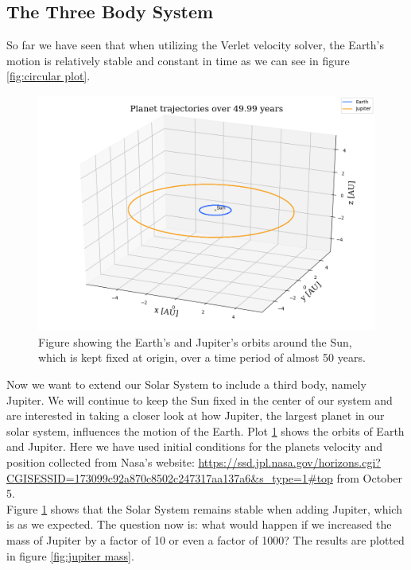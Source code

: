 \documentclass[12pt]{article}
\numberwithin{figure}{section}
\numberwithin{table}{section}
\begin{document}
\subsection{The Three Body System}
So far we have seen that when utilizing the Verlet velocity solver, the Earth's motion is relatively stable and constant in time as we can see in figure \ref{fig:circular plot}.

\begin{figure}[ht]
 \centerline{\includegraphics[scale = 0.55]{three_body_fixedsun_nasa_3D.png}}
 \caption{Figure showing the Earth's and Jupiter's orbits around the Sun, which is kept fixed at origin, over a time period of almost 50 years.}
 \label{fig:three body}
\end{figure}

Now we want to extend our Solar System to include a third body, namely Jupiter. We will continue to keep the Sun fixed in the center of our system and are interested in taking a closer look at how Jupiter, the largest planet in our solar system, influences the motion of the Earth. Plot \ref{fig:three body} shows the orbits of Earth and Jupiter. Here we have used initial conditions for the planets velocity and position collected from Nasa's website: \url{https://ssd.jpl.nasa.gov/horizons.cgi?CGISESSID=173099c92a870c8502c247317aa137a6&s_type=1#top} from October 5. \\

\noindent Figure \ref{fig:three body} shows that the Solar System remains stable when adding Jupiter, which is as we expected. The question now is: what would happen if we increased the mass of Jupiter by a factor of 10 or even a factor of 1000? The results are plotted in figure \ref{fig:jupiter mass}. \\
\end{document}
